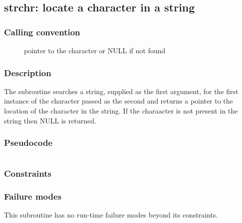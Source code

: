 \clearpage
{}
{}
\label{subr:strchr}
\subsection*{strchr: locate a character in a string}

\subsubsection*{Calling convention}

\begin{description}
\item[] pointer to the character or NULL if not found
\end{description}

\subsubsection*{Description}

The  subroutine searches a string, supplied as the
first argument, for the first instance of the character passed as the
second and returns a pointer to the location of the character in the
string.  If the charaacter is not present in the string then NULL is
returned.

\subsubsection*{Pseudocode}

\begin{verbatim}
\end{verbatim}

\subsubsection*{Constraints}

\subsubsection*{Failure modes}

This subroutine has no run-time failure modes beyond its constraints.
